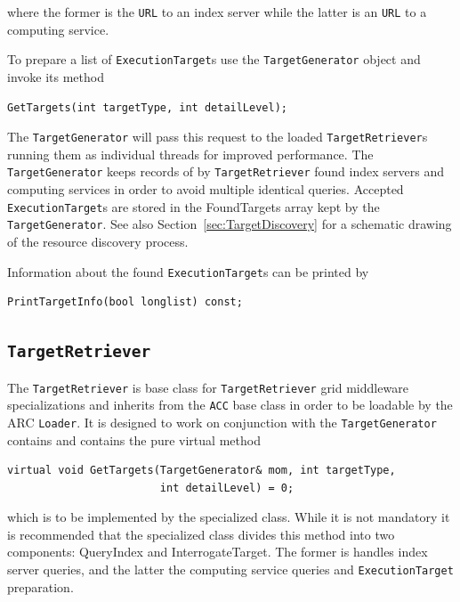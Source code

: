 \documentclass{book}
\newcommand{\TargetGenerator}{\texttt{TargetGenerator}}
\newcommand{\TargetRetriever}{\texttt{TargetRetriever}}
\newcommand{\ExecutionTarget}{\texttt{ExecutionTarget}}
\newcommand{\URL}{\texttt{URL}}
\begin{document}
where the former is the {\URL} to an index server while the latter is an {\URL} to a computing service.

To prepare a list of {\ExecutionTarget}s use the {\TargetGenerator} object and invoke its method

\begin{shaded}
\begin{verbatim}
GetTargets(int targetType, int detailLevel);
\end{verbatim}
\end{shaded}

The {\TargetGenerator} will pass this request to the loaded {\TargetRetriever}s running them as individual threads 
for improved performance. The {\TargetGenerator} keeps records of by {\TargetRetriever} found index servers and computing 
services in order to avoid multiple identical queries. Accepted {\ExecutionTarget}s are stored in the FoundTargets 
array kept by the {\TargetGenerator}. See also Section~\ref{sec:TargetDiscovery} for a schematic drawing of the 
resource discovery process.

Information about the found {\ExecutionTarget}s can be printed by 

\begin{shaded}
\begin{verbatim}
PrintTargetInfo(bool longlist) const;
\end{verbatim}
\end{shaded}

\subsection{{\TargetRetriever}} The {\TargetRetriever} is base class for {\TargetRetriever} grid middleware specializations and 
inherits from the \texttt{ACC} base class in order to be loadable by the ARC \texttt{Loader}. It is designed to work on conjunction 
with the {\TargetGenerator} contains and contains the pure virtual method

\begin{shaded}
\begin{verbatim}
virtual void GetTargets(TargetGenerator& mom, int targetType,
                        int detailLevel) = 0;
\end{verbatim}
\end{shaded}

which is to be implemented by the specialized class. While it is not mandatory it is recommended that the specialized class 
divides this method into two components: QueryIndex and InterrogateTarget. The former is handles index server queries, and the 
latter the computing service queries and {\ExecutionTarget} preparation. 
\end{document}
